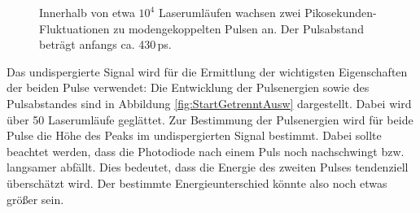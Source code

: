 \documentclass[bachelor,       %
               twoside,        %
               BCOR10mm,       %
               liststotoc,nomtotoc,bibtotoc, %
               english,ngerman, %
               final,          %
               ]{GAUBM}
\begin{document}
\begin{figure}[!htb]
   \centering
   \hfill
   \caption{Innerhalb von etwa $10^4$ Laserumläufen wachsen zwei Pikosekunden-Fluktuationen zu modengekoppelten Pulsen an.
   Der Pulsabstand beträgt anfangs ca. 430\,ps.}
   \label{fig:StartGetrennt}
\end{figure}
Das undispergierte Signal wird für die Ermittlung der wichtigsten Eigenschaften der beiden Pulse  verwendet: Die Entwicklung der Pulsenergien sowie des Pulsabstandes sind in Abbildung \ref{fig:StartGetrenntAusw} dargestellt.
Dabei wird über 50 Laserumläufe geglättet.
Zur Bestimmung der Pulsenergien wird für beide Pulse die Höhe des Peaks im undispergierten Signal bestimmt.
Dabei sollte beachtet werden, dass die Photodiode nach einem Puls noch nachschwingt bzw. langsamer abfällt.
Dies bedeutet, dass die Energie des zweiten Pulses tendenziell überschätzt wird.
Der bestimmte Energieunterschied könnte also noch etwas größer sein.
\end{document}

